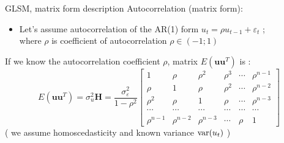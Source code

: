 \documentclass{beamer}
\begin{document}
\begin{frame}{GLSM, matrix form description}
Autocorrelation (matrix form):
\begin{itemize}
\item Let's assume autocorrelation of the AR(1) form $u_t = \rho u_{t-1}+ \varepsilon_t$  ; \\ where $\rho$ is coefficient of autocorrelation $\rho \in (-1; 1)$
\end{itemize}
\vspace{0.2cm}
If we know the autocorrelation coefficient $\rho$,  matrix $E(\boldsymbol{uu}^T)$ is :
$$E(\boldsymbol{uu}^T)= \sigma^2_u\bm{H} = \frac{\sigma^2_{\varepsilon}}{1-\rho^2}
    \begin{bmatrix}
    1&  \rho & \rho^2 & \rho^3 & \cdots & \rho^{n-1}\\
    \rho &  1&  \rho & \rho^2 & \cdots & \rho^{n-2} \\ 
    \rho^2 &  \rho &  1& \rho  & \cdots & \rho^{n-3} \\ 
    \cdots & \cdots & \cdots & \cdots & \cdots & \cdots \\
     \rho^{n-1} & \rho^{n-2} & \rho^{n-3} & \cdots & \rho & 1
\end{bmatrix}$$
( we assume homoscedasticity and known variance $\textnormal{var}(u_t)$ )
\end{frame}
\end{document}
